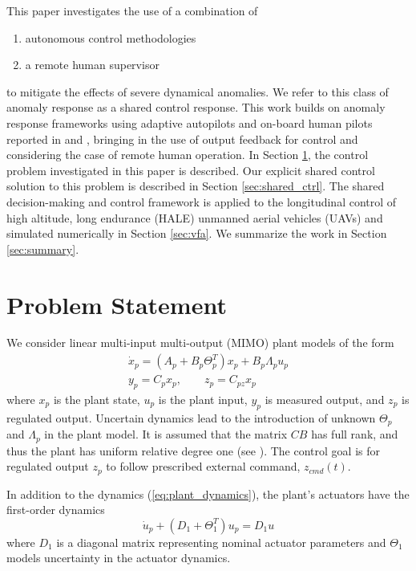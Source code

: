 \documentclass[english]{ifacconf}
\begin{document}
This paper investigates the use of a combination of 
\begin{enumerate}[label=(\alph*)]
	\item autonomous control methodologies
	\item a remote human supervisor
\end{enumerate}
to mitigate the effects of severe dynamical anomalies. We refer to this class of anomaly response as a shared control response. This work builds on anomaly response frameworks using adaptive autopilots and on-board human pilots reported in \cite{farjadian2017bumpless} and \cite{thomsen2018shared}, bringing in the use of output feedback for control and considering the case of remote human operation. In Section \ref{sec:problem}, the control problem investigated in this paper is described. Our explicit shared control solution to this problem is described in Section \ref{sec:shared_ctrl}. The shared decision-making and control framework is applied to the longitudinal control of high altitude, long endurance (HALE) unmanned aerial vehicles (UAVs) and simulated numerically in Section \ref{sec:vfa}. We summarize the work in Section \ref{sec:summary}.

\section{Problem Statement}\label{sec:problem}
We consider linear multi-input multi-output (MIMO) plant models of the form
\begin{equation}
\begin{gathered}
\dot x_p = (A_p + B_p \Theta_p^T) x_p + B_p \Lambda_p u_p \\
y_p = C_p x_p, \qquad z_p = C_{pz} x_p \label{eq:plant_dynamics}
\end{gathered}
\end{equation}
where $x_p$ is the plant state, $u_p$ is the plant input, $y_p$ is measured output, and $z_p$ is regulated output. Uncertain dynamics lead to the introduction of unknown $\Theta_p$ and $\Lambda_p$ in the plant model. It is assumed that the matrix $CB$ has full rank, and thus the plant has uniform relative degree one (see \cite{qu2016adaptive}). The control goal is for regulated output $z_p$ to follow prescribed external command, $z_{cmd}(t)$. 

In addition to the dynamics (\ref{eq:plant_dynamics}), the plant's actuators have the first-order dynamics
\begin{equation}
	\dot{u}_p + (D_1 + \Theta_1^T) u_p = D_1 u \label{eq:first_order_act}
\end{equation}
where $D_1$ is a diagonal matrix representing nominal actuator parameters and $\Theta_1$ models uncertainty in the actuator dynamics. 
\end{document}
